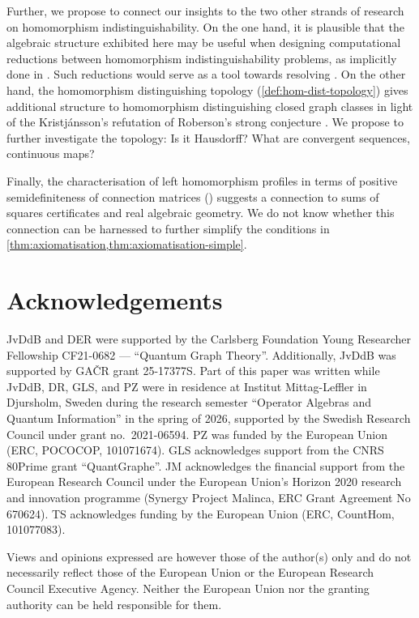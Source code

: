 \documentclass[11pt]{scrartcl}
\theoremstyle{definition}
\theoremstyle{plain}
\theoremstyle{remark}
\begin{document}
    Further, we propose to connect our insights to the two other strands of research on homomorphism indistinguishability.
    On the one hand, it is plausible that the algebraic structure exhibited here may be useful when designing computational reductions between homomorphism indistinguishability problems, as implicitly done in \cite[Theorem~20]{cerny_homomorphism_2026}.
    Such reductions would serve as a tool towards resolving \cite[Conjecture~25]{seppelt_algorithmic_2024}.
    On the other hand, the homomorphism distinguishing topology (\cref{def:hom-dist-topology}) gives additional structure to homomorphism distinguishing closed graph classes in light of the Kristj\'ansson's refutation of Roberson's strong conjecture \cite{kristjansson_counterexamples_2026}.
    We propose to further investigate the topology: Is it Hausdorff? What are convergent sequences, continuous maps?

    Finally, the characterisation of left homomorphism profiles in terms of positive semidefiniteness of connection matrices (\textcite{lovasz_dual_2010}) suggests a connection to sums of squares certificates and real algebraic geometry. We do not know whether this connection can be harnessed to further simplify the conditions in \cref{thm:axiomatisation,thm:axiomatisation-simple}.
    
    \newpage 
	\section*{Acknowledgements}
    JvDdB and DER were supported by the Carlsberg Foundation Young Researcher Fellowship CF21-0682 --- ``Quantum Graph Theory''. Additionally, JvDdB was supported by GAČR grant 25-17377S. Part of this paper was written while JvDdB, DR, GLS, and PZ were in residence at Institut Mittag-Leffler in Djursholm, Sweden during the research semester ``Operator Algebras and Quantum Information'' in the spring of 2026, supported by the Swedish Research Council under grant no.~2021-06594.
    PZ was funded by the European Union (ERC, POCOCOP, 101071674). 
    GLS acknowledges support from the CNRS 80Prime grant ``QuantGraphe''.
    JM acknowledges the financial support from the European Research Council under the European Union's Horizon 2020 research and innovation programme (Synergy Project Malinca, ERC Grant Agreement No 670624).
    TS acknowledges funding by the European Union (ERC, CountHom, 101077083).

    Views and opinions expressed are however those of the author(s) only and do not necessarily reflect those of the European Union or the European Research Council Executive Agency. Neither the European Union nor the granting authority can be held responsible for them.
\end{document}
